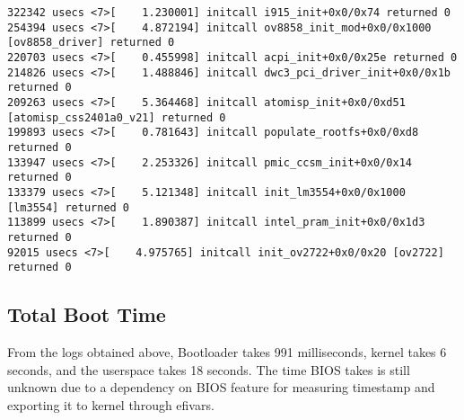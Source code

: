 \begin{Verbatim}[fontsize=\smaller]
322342 usecs <7>[    1.230001] initcall i915_init+0x0/0x74 returned 0
254394 usecs <7>[    4.872194] initcall ov8858_init_mod+0x0/0x1000 [ov8858_driver] returned 0
220703 usecs <7>[    0.455998] initcall acpi_init+0x0/0x25e returned 0
214826 usecs <7>[    1.488846] initcall dwc3_pci_driver_init+0x0/0x1b returned 0
209263 usecs <7>[    5.364468] initcall atomisp_init+0x0/0xd51 [atomisp_css2401a0_v21] returned 0
199893 usecs <7>[    0.781643] initcall populate_rootfs+0x0/0xd8 returned 0
133947 usecs <7>[    2.253326] initcall pmic_ccsm_init+0x0/0x14 returned 0
133379 usecs <7>[    5.121348] initcall init_lm3554+0x0/0x1000 [lm3554] returned 0
113899 usecs <7>[    1.890387] initcall intel_pram_init+0x0/0x1d3 returned 0
92015 usecs <7>[    4.975765] initcall init_ov2722+0x0/0x20 [ov2722] returned 0
\end{Verbatim}

\subsection{Total Boot Time}

From the logs obtained above, Bootloader takes 991 milliseconds,
kernel takes 6 seconds, and the userspace takes 18 seconds. The time
BIOS takes is still unknown due to a dependency on BIOS feature for
measuring timestamp and exporting it to kernel through efivars.

